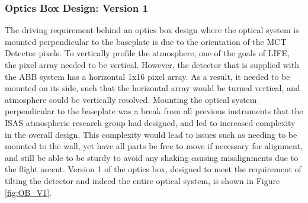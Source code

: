 \subsubsection{Optics Box Design: Version 1}
The driving requirement behind an optics box design where the optical system is mounted perpendicular to the baseplate is due to the orientation of the MCT Detector pixels. To vertically profile the atmosphere, one of the goals of LIFE, the pixel array needed to be vertical. However, the detector that is supplied with the ABB system has a horizontal 1x16 pixel array. As a result, it needed to be mounted on its side, such that the horizontal array would be turned vertical, and atmosphere could be vertically resolved. Mounting the optical system perpendicular to the baseplate was a break from all previous instruments that the ISAS atmospheric research group had designed, and led to increased complexity in the overall design. This complexity would lead to issues such as needing to be mounted to the wall, yet have all parts be free to move if necessary for alignment, and still be able to be sturdy to avoid any shaking causing misalignments due to the flight ascent. Version 1 of the optics box, designed to meet the requirement of tilting the detector and indeed the entire optical system, is shown in Figure \ref{fig:OB_V1}.

